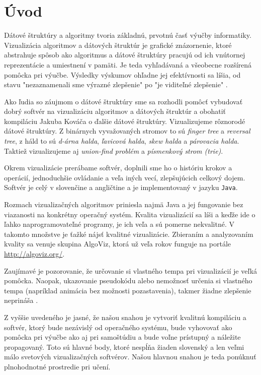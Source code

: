 \section{Úvod}
Dátové štruktúry a algoritmy tvoria základnú, prvotnú časť výučby 
informatiky. Vizualizácia algoritmov a dátových štruktúr je grafické 
znázornenie, ktoré abstrahuje spôsob ako algoritmus a dátové štruktúry 
pracujú od ich vnútornej reprezentácie a umiestnení v pamäti. Je teda 
vyhľadávaná a všeobecne rozšírená pomôcka pri výučbe. Výsledky výskumov 
ohľadne jej efektívnosti sa líšia, od stavu "nezaznamenali sme výrazné 
zlepšenie" po "je viditeľné zlepšenie" \citep{shaffer}.

Ako ľudia so záujmom o dátové štruktúry sme sa rozhodli pomôcť vybudovať 
dobrý softvér na vizualizáciu algoritmov a dátových štruktúr a obohatiť 
kompiláciu Jakuba Kováča \citep{kuko} o ďalšie dátové štruktúry. 
Vizualizujeme rôznorodé dátové štruktúry. Z binárnych vyvažovaných stromov 
to sú \emph{finger tree} a \emph{reversal tree}, z háld to sú \emph{d-árna 
halda}, \emph{ľavicová halda}, \emph{skew halda} a \emph{párovacia halda}. 
Taktiež vizualizujeme aj \emph{union-find problém} a 
\emph{písmenkový strom (trie)}. 

Okrem vizualizácie prerábame softvér, doplnili sme ho o históriu krokov 
a operácií, jednoduchšie ovládanie a veľa iných vecí, zlepšujúcich 
celkový dojem. Softvér je celý v slovenčine a angličtine a je 
implementovaný v jazyku \texttt{Java}.

Rozmach vizualizačných algoritmov priniesla najmä Java a jej fungovanie 
bez viazanosti na konkrétny operačný systém. Kvalita vizualizácií sa líši 
a keďže ide o ľahko naprogramovateľné programy, je ich veľa a sú pomerne 
nekvalitné. V takomto množstve je ťažké nájsť kvalitné vizualizácie. 
Zbieraním a analyzovaním kvality sa venuje skupina AlgoViz, ktorá už 
veľa rokov funguje na portále \url{http://algoviz.org/}.

Zaujímavé je pozorovanie, že určovanie si vlastného tempa pri vizualizácií 
je veľká pomôcka. Naopak, ukazovanie pseudokódu alebo nemožnosť určenia si
vlastného tempa (napríklad animácia bez možnosti pozastavenia), takmer 
žiadne zlepšenie neprináša \citep{shaffer,saraiya}.

Z vyššie uvedeného je jasné, že našou snahou je vytvoriť kvalitnú kompiláciu 
a softvér, ktorý bude nezávislý od operačného systému, bude vyhovovať ako 
pomôcka pri výučbe ako aj pri samoštúdiu a bude voľne prístupný a náležite 
propagovaný. Toto sú hlavné body, ktoré nespĺňa žiaden slovenský a 
len veľmi málo svetových vizualizačných softvérov. Našou hlavnou snahou 
je teda ponúknuť plnohodnotné prostredie pri učení.


